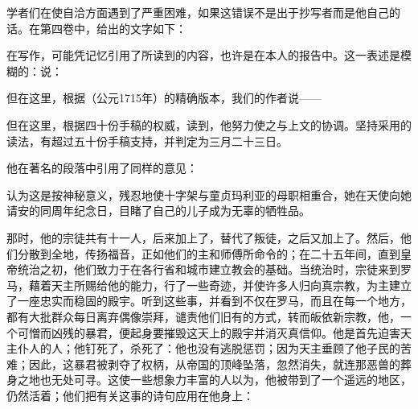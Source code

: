 \par

学者们在使自洽方面遇到了严重困难，如果这错误不是出于抄写者而是他自己的话。在第四卷中，给出的文字如下：\par

\par

在写作，可能凭记忆引用了所读到的内容，也许是在本人的报告中。这一表述是模糊的：说：\par

但在这里，根据（公元1715年）的精确版本，我们的作者说——\par

\par

但在这里，根据四十份手稿的权威，读到，他努力使之与上文的协调。坚持采用的读法，有超过五十份手稿支持，并判定为三月二十三日。\par

他在著名的段落中引用了同样的意见：\par

\par

认为这是按神秘意义，残忍地使十字架与童贞玛利亚的母职相重合，她在天使向她请安的同周年纪念日，目睹了自己的儿子成为无辜的牺牲品。\par

那时，他的宗徒共有十一人，后来加上了，替代了叛徒，之后又加上了。然后，他们分散到全地，传扬福音，正如他们的主和师傅所命令的；在二十五年间，直到皇帝统治之初，他们致力于在各行省和城市建立教会的基础。当统治时，宗徒来到罗马，藉着天主所赐给他的能力，行了一些奇迹，并使许多人归向真宗教，为主建立了一座忠实而稳固的殿宇。听到这些事，并看到不仅在罗马，而且在每一个地方，都有大批群众每日离弃偶像崇拜，谴责他们旧有的方式，转而皈依新宗教，他，一个可憎而凶残的暴君，便起身要摧毁这天上的殿宇并消灭真信仰。他是首先迫害天主仆人的人；他钉死了，杀死了：他也没有逃脱惩罚；因为天主垂顾了他子民的苦难；因此，这暴君被剥夺了权柄，从帝国的顶峰坠落，忽然消失，就连那恶兽的葬身之地也无处可寻。这使一些想象力丰富的人以为，他被带到了一个遥远的地区，仍然活着；他们把有关这事的诗句应用在他身上：\par

